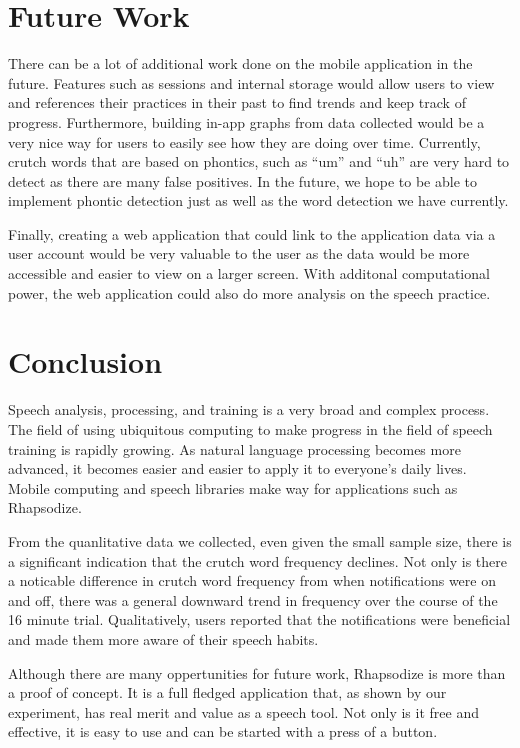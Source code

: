 \documentclass{sigchi}
\begin{document}
\section{Future Work}
There can be a lot of additional work done on the mobile application in the future. Features such as sessions and internal storage would allow users to view and references their practices in their past to find trends and keep track of progress. Furthermore, building in-app graphs from data collected would be a very nice way for users to easily see how they are doing over time. Currently, crutch words that are based on phontics, such as ``um'' and ``uh'' are very hard to detect as there are many false positives. In the future, we hope to be able to implement phontic detection just as well as the word detection we have currently.

Finally, creating a web application that could link to the application data via a user account would be very valuable to the user as the data would be more accessible and easier to view on a larger screen. With additonal computational power, the web application could also do more analysis on the speech practice.

\section{Conclusion}

Speech analysis, processing, and training is a very broad and complex process. The field of using ubiquitous computing to make progress in the field of speech training is rapidly growing. As natural language processing becomes more advanced, it becomes easier and easier to apply it to everyone's daily lives. Mobile computing and speech libraries make way for applications such as Rhapsodize. 

From the quanlitative data we collected, even given the small sample size, there is a significant indication that the crutch word frequency declines. Not only is there a noticable difference in crutch word frequency from when notifications were on and off, there was a general downward trend in frequency over the course of the 16 minute trial. Qualitatively, users reported that the notifications were beneficial and made them more aware of their speech habits. 

Although there are many oppertunities for future work, Rhapsodize is more than a proof of concept. It is a full fledged application that, as shown by our experiment, has real merit and value as a speech tool. Not only is it free and effective, it is easy to use and can be started with a press of a button. 
\end{document}
